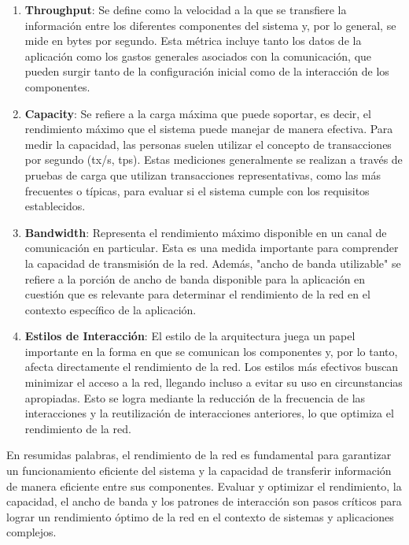 \documentclass{article}
\begin{document}
 		
 		\begin{enumerate}
 			\item \textbf{Throughput}: Se define como la velocidad a la que se transfiere la información entre los diferentes componentes del sistema y, por lo general, se mide en bytes por segundo. Esta métrica incluye tanto los datos de la aplicación como los gastos generales asociados con la comunicación, que pueden surgir tanto de la configuración inicial como de la interacción de los componentes.
 			
 			\item \textbf{Capacity}: Se refiere a la carga máxima que puede soportar, es decir, el rendimiento máximo que el sistema puede manejar de manera efectiva. Para medir la capacidad, las personas suelen utilizar el concepto de transacciones por segundo (tx/s, tps). Estas mediciones generalmente se realizan a través de pruebas de carga que utilizan transacciones representativas, como las más frecuentes o típicas, para evaluar si el sistema cumple con los requisitos establecidos.	
 			
 			 			
 			\item \textbf{Bandwidth}\label{sec:bandwidth}: Representa el rendimiento máximo disponible en un canal de comunicación en particular. Esta es una medida importante para comprender la capacidad de transmisión de la red. Además, "ancho de banda utilizable" se refiere a la porción de ancho de banda disponible para la aplicación en cuestión que es relevante para determinar el rendimiento de la red en el contexto específico de la aplicación.
 			
 						
 			\item \textbf{Estilos de Interacción}: El estilo de la arquitectura juega un papel importante en la forma en que se comunican los componentes y, por lo tanto, afecta directamente el rendimiento de la red. Los estilos más efectivos buscan minimizar el acceso a la red, llegando incluso a evitar su uso en circunstancias apropiadas. Esto se logra mediante la reducción de la frecuencia de las interacciones y la reutilización de interacciones anteriores, lo que optimiza el rendimiento de la red.
 			
 					 	
 		\end{enumerate}
 		
 		En resumidas palabras, el rendimiento de la red es fundamental para garantizar un funcionamiento eficiente del sistema y la capacidad de transferir información de manera eficiente entre sus componentes. Evaluar y optimizar el rendimiento, la capacidad, el ancho de banda y los patrones de interacción son pasos críticos para lograr un rendimiento óptimo de la red en el contexto de sistemas y aplicaciones complejos.
 		
\end{document}
